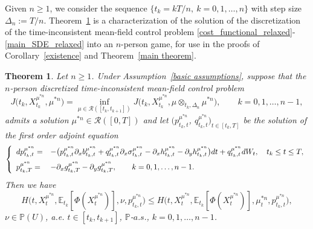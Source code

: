 \documentclass[12pt]{article}
\newtheorem{theorem}[prop]{Theorem}
\theoremstyle{named}
\numberwithin{equation}{section}
\def\P{{\mathord{\mathbb P}}}
\begin{document}
\medskip

Given ${n}\geq 1$, we consider the sequence $\{t_k = k T/{n}, \ k = 0, 1, \ldots , {n}\}$ with step size $\Delta_n := T/n$.
Theorem~\ref{MP N person} is a characterization
of the solution of the discretization
 of the time-inconsistent mean-field control problem \eqref{cost_functional_relaxed}-\eqref{main_SDE_relaxed}
 into an ${n}$-person game,
 for use in the proofs of Corollary~\ref{existence} and Theorem~\ref{main theorem}.
\begin{theorem}
  \label{MP N person}
\noindent
Let $n\geq 1$.
Under Assumption~\ref{basic assumptions}, suppose that
 the  ${n}$-person discretized
 time-inconsistent mean-field control problem
\begin{equation}
\label{N-person}
J\bigl(t_k,X^{\mu^{*n} }_{t_k}, \mu^{*n} \bigr) = \inf\limits_{\mu \in \mathcal{R}( [t_k,t_{k+1}] )} J\bigl(t_k,X^{\mu^{*n} }_{t_k}, \mu \otimes_{t_k,\Delta_n} \mu^{*n} \bigr),
\qquad
k=0,1,\ldots , {n}-1,
\end{equation}
admits a solution $\mu^{*n} \in\mathcal{R}([0,T])$
and let
$\big(p^{\mu^{*n} }_{t_k,t}$, $q^{\mu^{*n} }_{t_k,t}\big)_{t\in [t_k,T]}$
  be the solution of the first order adjoint equation
  \begin{equation}
    \label{TC adjoint discrete}
  \left\{
  \begin{array}{ll}
    \displaystyle
    dp^{\mu^{*n} }_{t_k,t} =& -\big(p^{\mu^{*n} }_{t_k,t}\partial_xb^{\mu^{*n} }_{t_k,t}  + q^{\mu^{*n} }_{t_k,t}\partial_x\sigma^{\mu^{*n} }_{t_k,t} - \partial_xh^{\mu^{*n} }_{t_k,t} - \partial_yh^{\mu^{*n} }_{t_k,t}\big) dt + q^{\mu^{*n} }_{t_k,t} dW_t, \quad
    t_k \leq t \leq T,
\medskip
 \\
    \displaystyle
    p^{\mu^{*n} }_{t_k,T} =& - \partial_xg^{\mu^{*n} }_{t_k,T} - \partial_yg^{\mu^{*n} }_{t_k,T},
    \qquad k = 0,1,\ldots , n-1.
  \end{array}
  \right.
\end{equation}
  Then we have
\begin{equation}
\label{MP k H compare N person}
 H\bigl(t,X^{\mu^{*n} }_t,\mathbb{E}_{t_k}[\Phi(X^{\mu^{*n} }_t)],\nu,p^{\mu^{*n} }_{t_k,t}\bigr) \leq H\bigl(t,X^{\mu^{*n} }_t,\mathbb{E}_{t_k}[\Phi(X^{\mu^{*n} }_t)],\mu^{*n} _t,p^{\mu^{*n} }_{t_k,t}\bigr),
\end{equation}
$\nu \in \P (U)$, {\em a.e.} $t \in [t_k,t_{k+1}]$, $\P$-$a.s.$,
 $k=0,1,\ldots , n-1$.
\end{theorem}
\end{document}
